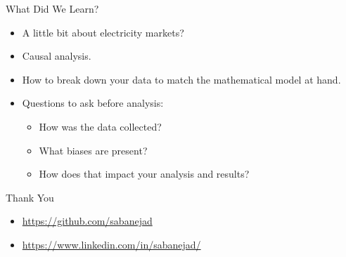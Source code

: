 \documentclass{beamer}
\begin{document}
\begin{frame}{What Did We Learn?}
  \begin{itemize}
    \item<+-> A little bit about electricity markets?
    \item<+-> Causal analysis.
    \item<+-> How to break down your data to match the mathematical model at hand.
    \item<+-> Questions to ask before analysis:
    \begin{itemize}
      \item<+-> How was the data collected? 
      \item<+-> What biases are present?
      \item<+-> How does that impact your analysis and results?
    \end{itemize}
  \end{itemize}
\end{frame}

\begin{frame}{Thank You}
  \begin{itemize}
  \item \url{https://github.com/sabanejad}
  \item \url{https://www.linkedin.com/in/sabanejad/}
  \end{itemize}
\end{frame}


\end{document}
